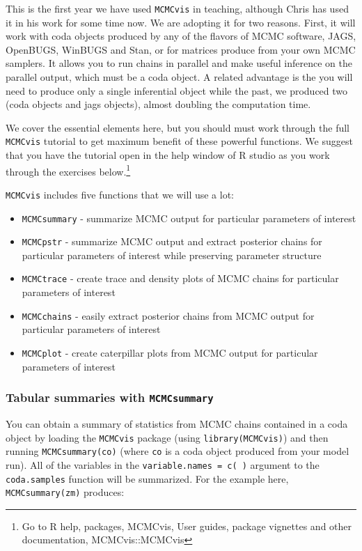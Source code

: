 \documentclass[12pt,english]{article}
\begin{document}
This is the first year we have used \texttt{MCMCvis} in teaching, although Chris has used it in his work for some time now.  We are adopting it for two reasons.  First, it will work with coda objects produced by any of the flavors of MCMC software, JAGS, OpenBUGS, WinBUGS and Stan, or for matrices produce from your own MCMC samplers. It allows you to run chains in parallel and make useful inference on the parallel output, which must be a coda object.  A related advantage is the you will need to produce only a single inferential object while the past, we produced two (coda objects and jags objects), almost doubling the computation time.

We cover the essential elements here, but you should must work through the  full \texttt{MCMCvis} tutorial  to get maximum benefit of these powerful functions.  We suggest that you have the tutorial open in the help window of R studio as you work through the exercises below.\footnote{Go to R help, packages, MCMCvis, User guides, package vignettes and other documentation, MCMCvis::MCMCvis	}


 \texttt{MCMCvis} includes five functions that we will use a lot:
\begin{itemize}
\item \texttt{MCMCsummary} - summarize MCMC output for particular parameters of interest
\item \texttt{MCMCpstr} - summarize MCMC output and extract posterior chains for particular parameters of interest while preserving parameter structure
\item \texttt{MCMCtrace} - create trace and density plots of MCMC chains for particular parameters of interest
\item \texttt{MCMCchains} - easily extract posterior chains from MCMC output for particular parameters of interest
\item \texttt{MCMCplot} - create caterpillar plots from MCMC output for particular parameters of interest 
\end{itemize}


\subsubsection{Tabular summaries with \texttt{MCMCsummary}}


You can obtain a summary of statistics from MCMC chains contained in a coda object by loading the \texttt{MCMCvis} package (using \texttt{library(MCMCvis)}) and then running \texttt{MCMCsummary(co)} (where \texttt{co} is a coda object produced from your model run). All of the variables in the \texttt{variable.names = c( )} argument to the \texttt{coda.samples} function will be summarized. For the example here, \texttt{MCMCsummary(zm)} produces:
\end{document}
